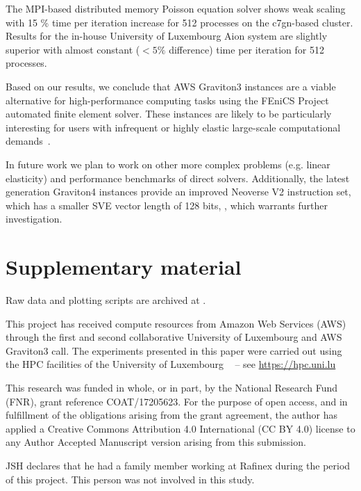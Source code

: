 The MPI-based distributed memory Poisson equation solver shows weak scaling with
15 \% time per iteration increase for 512 processes on the c7gn-based cluster.
Results for the in-house University of Luxembourg Aion system are slightly
superior with almost constant ($< 5 \%$ difference) time per iteration for 512
processes.

Based on our results, we conclude that AWS Graviton3 instances are a viable
alternative for high-performance computing tasks using the FEniCS Project
automated finite element solver. These instances are likely to be particularly
interesting for users with infrequent or highly elastic large-scale
computational demands~\cite{emeras_amazon_2016}.

In future work we plan to work on other more complex problems (e.g. linear
elasticity) and performance benchmarks of direct solvers. Additionally, the
latest generation Graviton4 instances provide an improved Neoverse V2
instruction set, which has a smaller SVE vector length of 128 bits,
\citep{ArmReferenceManualNeoverseV2}, which warrants further investigation.

\section*{Supplementary material}
Raw data and plotting scripts are archived at \citep{habera_2024_13748405}.

\begin{acknowledgement}
This project has received compute resources from Amazon Web Services (AWS)
through the first and second collaborative University of Luxembourg and
AWS Graviton3 call. The experiments presented in this paper were
carried out using the HPC facilities of the University of Luxembourg
~\cite{VCPKVO_HPCCT22} {\small -- see \url{https://hpc.uni.lu}}

This research was funded in whole, or in part, by the National Research
Fund (FNR), grant reference COAT/17205623. For the purpose of open
access, and in fulfillment of the obligations arising from the grant
agreement, the author has applied a Creative Commons Attribution 4.0
International (CC BY 4.0) license to any Author Accepted Manuscript
version arising from this submission.

JSH declares that he had a family member working at Rafinex during the period
of this project. This person was not involved in this study.
\end{acknowledgement}



